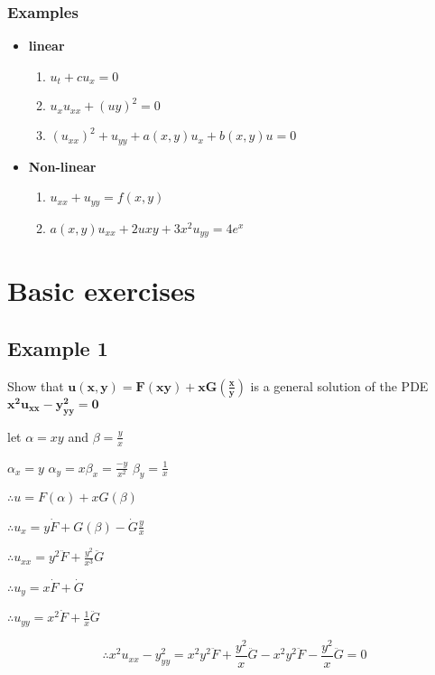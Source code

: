 \documentclass[12 pt]{article}
\begin{document}
\subsubsection*{Examples}
\begin{itemize}
     \item \textbf{linear}\begin{enumerate}
         \item $u_t +c u_x=0$
         \item $u_xu_{xx}+(u{y})^2=0$
         \item $(u_{xx})^2+u_{yy}+a(x,y)u_x+b(x,y)u=0$
     \end{enumerate}
     \item \textbf{Non-linear}\begin{enumerate}
          \item $u_{xx}+u_{yy}=f(x,y)$
          \item $a(x,y)u_{xx}+2u{xy}+3x^2u_{yy}=4e^x$
     \end{enumerate}
 \end{itemize}
 \newpage
\section{Basic exercises}
\subsection*{Example 1}
Show that $\mathbf{u(x,y) = F(xy) + xG(\frac{x}{y})}$ is a general solution of the PDE\\ $\mathbf{x^2u_{xx}-y^2_{yy}=0}$
\begin{tcolorbox}
[width=\linewidth, sharp corners=all, colback=white!95!black]
let $\alpha=xy$ and $\beta=\frac{y}{x}$

$\alpha_x=y$\hspace{0.3cm} $\alpha_y=x$\hspace{0.3cm}$\beta_x=\frac{-y}{x^2}$\hspace{0.3cm} $\beta_y=\frac{1}{x}$

$\therefore u=F(\alpha)+xG(\beta)$

$\therefore u_x= y\dot{F}+ G(\beta)- \dot{G} \frac{y}{x}$

$\therefore u_{xx} = y^2\ddot{F}+\frac{y^2}{x^3}\ddot{G}$

$\therefore u_y=x\dot{F}+\dot{G}$

$\therefore u_{yy}=x^2\dot{F}+\frac{1}{x}\ddot{G}$

$$\boxed{
\therefore x^2u_{xx}-y^2_{yy} = x^2y^2\ddot{F}+\frac{y^2}{x}\ddot{G}-x^2y^2\ddot{F}-\frac{y^2}{x}\ddot{G}=0}$$
\end{tcolorbox}
\end{document}

